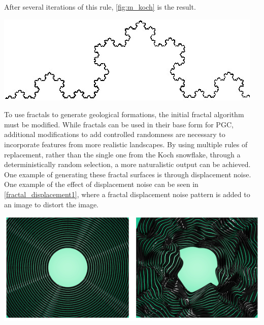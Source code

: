 \documentclass[10pt]{report}
\begin{document}
		After several iterations of this rule, \autoref{fig:m_koch} is the result.
		
		\begin{minipage}{\textwidth}
			\centering
			\includegraphics[scale=0.5]{m_koch}
			\label{fig:m_koch}
		\end{minipage}
		
		To use fractals to generate geological formations, the initial fractal algorithm must be modified. While fractals can be used in their base form for PGC, additional modifications to add controlled randomness are necessary to incorporate features from more realistic landscapes. By using multiple rules of replacement, rather than the single one from the Koch snowflake, through a deterministically random selection, a more naturalistic output can be achieved. One example of generating these fractal surfaces is through displacement noise. One example of the effect of displacement noise can be seen in \autoref{fractal_displacement1}, where a fractal displacement noise pattern is added to an image to distort the image. 
		
		\begin{minipage}{\textwidth}
			\centering
			\includegraphics[scale=1.0]{fractal_displacement1}
			\label{fig:fractal_displacement1}
		\end{minipage}
		
\end{document}
